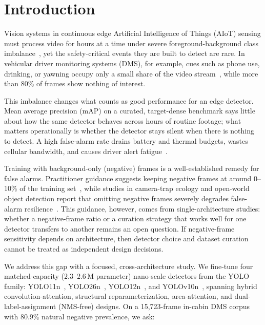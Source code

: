 \documentclass[conference]{IEEEtran}
\begin{document}
\section{Introduction}
\label{sec:intro}

Vision systems in continuous edge Artificial Intelligence of Things
(AIoT) sensing must process video
for hours at a time under severe foreground-background class
imbalance~\cite{lin2017focal}, yet the safety-critical events they
are built to detect are rare. In vehicular driver monitoring systems
(DMS), for example, cues such as phone use, drinking, or yawning
occupy only a small share of the video stream~\cite{sengupta2023dms},
while more than 80\% of frames show nothing of interest.

This imbalance changes what counts as good performance for an edge
detector. Mean average precision (mAP) on a curated, target-dense
benchmark says little about how the same detector behaves across
hours of routine footage; what matters operationally is whether the
detector stays silent when there is nothing to detect. A high
false-alarm rate drains battery and thermal budgets, wastes cellular
bandwidth, and causes driver alert fatigue~\cite{sengupta2023dms,chen2023falsealert}.

Training with background-only (negative) frames is a well-established
remedy for false alarms. Practitioner guidance suggests keeping
negative frames at around 0--10\% of the training set~\cite{ultralytics2024tips},
while studies in camera-trap ecology and open-world object detection
report that omitting negative frames severely degrades false-alarm
resilience~\cite{beery2018terra,oksuz2021imbalance}. This guidance,
however, comes from single-architecture studies: whether a
negative-frame ratio or a curation strategy that works well for one
detector transfers to another remains an open question. If
negative-frame sensitivity depends on architecture, then detector
choice and dataset curation cannot be treated as independent design
decisions.

We address this gap with a focused, cross-architecture study.
We fine-tune four matched-capacity ($2.3$--$2.6$\,M parameter)
nano-scale detectors from the YOLO family: YOLO11n~\cite{jocher2024yolo11},
YOLO26n~\cite{ultralytics2026yolo26}, YOLO12n~\cite{tian2025yolo12},
and YOLOv10n~\cite{wang2024yolov10}, spanning hybrid
convolution-attention, structural reparameterization, area-attention,
and dual-label-assignment (NMS-free) designs. On a 15,723-frame
in-cabin DMS corpus with 80.9\% natural negative prevalence, we ask:
\end{document}

